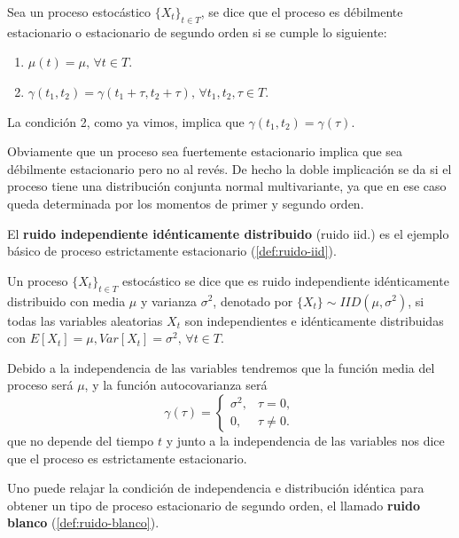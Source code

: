 \begin{definicion}
  Sea un proceso estocástico $\{X_t\}_{t \in T}$, se dice que el proceso es débilmente estacionario o estacionario de segundo orden si se cumple lo siguiente:
  \begin{enumerate}
    \item $\mu(t) = \mu, \, \forall t \in T$.
    \item $\gamma(t_1, t_2) = \gamma  (t_1 + \tau, t_2 + \tau), \, \forall t_1, t_2, \tau \in T$.
  \end{enumerate}

  La condición 2, como ya vimos, implica que $\gamma(t_1, t_2) = \gamma(\tau)$.
  \label{def:debilmente-estacionario}
\end{definicion}

Obviamente que un proceso sea fuertemente estacionario implica que sea débilmente estacionario pero no al revés. De hecho la doble implicación se da si el proceso tiene una distribución conjunta normal multivariante, ya que en ese caso queda determinada por los momentos de primer y segundo orden.

El \textbf{ruido independiente idénticamente distribuido} (ruido iid.) es el ejemplo básico de proceso estrictamente estacionario (\autoref{def:ruido-iid}).

\begin{definicion}
  Un proceso $\{X_t\}_{t \in T}$ estocástico se dice que es ruido independiente idénticamente distribuido con media $\mu$ y varianza $\sigma^2$, denotado por $\{X_t\} \sim IID(\mu, \sigma^2)$, si todas las variables aleatorias $X_t$ son independientes e idénticamente distribuidas con $E[X_t] = \mu, Var[X_t] = \sigma^2, \, \forall t \in T$.
\label{def:ruido-iid}
\end{definicion}

Debido a la independencia de las variables tendremos que la función media del proceso será $\mu$, y la función autocovarianza será
\begin{equation}
  \gamma(\tau) =
  \begin{cases}
    \sigma^2, & \tau = 0, \\
    0, & \tau \neq 0.
  \end{cases}
  \label{eq:autocov-ruido}
\end{equation}
que no depende del tiempo $t$ y junto a la independencia de las variables nos dice que el proceso es estrictamente estacionario.

Uno puede relajar la condición de independencia e distribución idéntica para obtener un tipo de proceso estacionario de segundo orden, el llamado \textbf{ruido blanco} (\autoref{def:ruido-blanco}).

